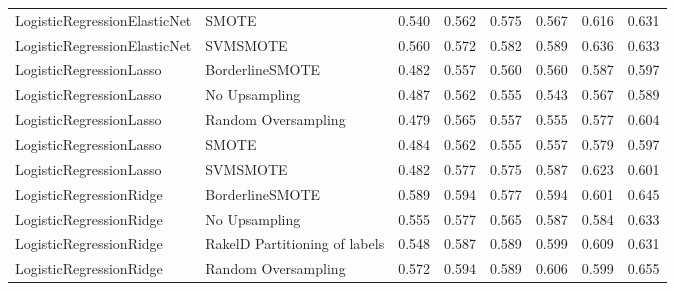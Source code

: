 \begin{tabular}{llllllll}
   LogisticRegressionElasticNet &                         SMOTE & 0.540 &                     0.562 &                 0.575 &                  0.567 &                                   0.616 &    0.631 \\
   LogisticRegressionElasticNet &                      SVMSMOTE & 0.560 &                     0.572 &                 0.582 &                  0.589 &                                   0.636 &    0.633 \\
        LogisticRegressionLasso &               BorderlineSMOTE & 0.482 &                     0.557 &                 0.560 &                  0.560 &                                   0.587 &    0.597 \\
        LogisticRegressionLasso &                 No Upsampling & 0.487 &                     0.562 &                 0.555 &                  0.543 &                                   0.567 &    0.589 \\
        LogisticRegressionLasso &           Random Oversampling & 0.479 &                     0.565 &                 0.557 &                  0.555 &                                   0.577 &    0.604 \\
        LogisticRegressionLasso &                         SMOTE & 0.484 &                     0.562 &                 0.555 &                  0.557 &                                   0.579 &    0.597 \\
        LogisticRegressionLasso &                      SVMSMOTE & 0.482 &                     0.577 &                 0.575 &                  0.587 &                                   0.623 &    0.601 \\
        LogisticRegressionRidge &               BorderlineSMOTE & 0.589 &                     0.594 &                 0.577 &                  0.594 &                                   0.601 &    0.645 \\
        LogisticRegressionRidge &                 No Upsampling & 0.555 &                     0.577 &                 0.565 &                  0.587 &                                   0.584 &    0.633 \\
        LogisticRegressionRidge & RakelD Partitioning of labels & 0.548 &                     0.587 &                 0.589 &                  0.599 &                                   0.609 &    0.631 \\
        LogisticRegressionRidge &           Random Oversampling & 0.572 &                     0.594 &                 0.589 &                  0.606 &                                   0.599 &    0.655 \\

\end{tabular}
